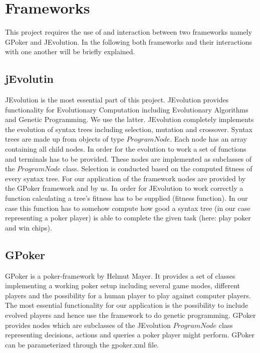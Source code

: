 \documentclass[12pt,a4paper]{article}
\title{}
\author{}
\date{}
\begin{document}
	\maketitle
	\section{Frameworks}
	This project requires the use of and interaction between two frameworks namely GPoker and JEvolution. In the following both frameworks and their interactions with one another will be briefly explained.

	\subsection{jEvolutin}
	JEvolution is the most essential part of this project. JEvolution provides functionality for Evolutionary Computation including Evolutionary Algorithms and Genetic Programming.
	We use the latter. JEvolution completely implements the evolution of syntax trees including selection, mutation and crossover. Syntax trees are made up from objects of type
	$ProgramNode$. Each node has an array containing all child nodes. In order for the evolution to work a set of functions and terminals has to be provided. These nodes
	are implemented as subclasses of the $ProgramNode$ class. Selection is conducted based on the computed fitness of every syntax tree. For our application of the framework
	nodes are provided by the GPoker framework and by us. In order for JEvolution to work correctly a function calculating a tree's fitness has to be supplied (fitness function). In
	our case this function has to somehow compute how good a syntax tree (in our case representing a poker player) is able to complete the given task (here: play poker and win
	chips).

	\subsection{GPoker}
	GPoker is a poker-framework by Helmut Mayer. It provides a set of classes implementing a working poker setup including several game modes, different players and the
	possibility for a human player to play against computer players. The most essential functionality for our application is the possibility to include evolved players and hence
	use the framework to do genetic programming. GPoker provides nodes which are subclasses of the JEvolution $ProgramNode$ class representing decisions, actions and queries a
	poker player might perform. GPoker can be parameterized through the gpoker.xml file.
\end{document}
